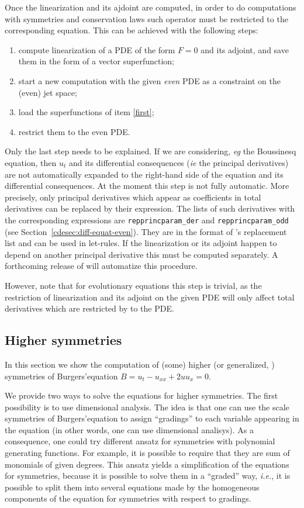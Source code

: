 Once the linearization and its ajdoint are computed, in order to do
computations with symmetries and conservation laws such operator must be
restricted to the corresponding equation. This can be achieved with the
following steps:
\begin{enumerate}
\item \label{first} compute linearization of a PDE of the form $F=0$ and its
  adjoint, and save them in the form of a vector superfunction;
\item start a new computation with the given \emph{even} PDE as a constraint on
  the (even) jet space;
\item load the superfunctions of item \ref{first};
\item restrict them to the even PDE.
\end{enumerate}
Only the last step needs to be explained. If we are considering, \emph{eg} the
Boussinesq equation, then $u_t$ and its differential consequences (\emph{ie}
the principal derivatives) are not automatically expanded to the right-hand
side of the equation and its differential consequences. At the moment this step
is not fully automatic. More precisely, only principal derivatives which appear
as coefficients in total derivatives can be replaced by their expression.  The
lists of such derivatives with the corresponding expressions are
\texttt{repprincparam\_der} and \texttt{repprincparam\_odd} (see
Section~\ref{cdesec:diff-equat-even}). They are in the format of \REDUCE's
replacement list and can be used in let-rules. If the linearization or its
adjoint happen to depend on another principal derivative this must be computed
separately. A forthcoming release of \REDUCE will automatize this procedure.

However, note that for evolutionary equations this step is trivial, as the
restriction of linearization and its adjoint on the given PDE will only affect
total derivatives which are restricted by \cde to the PDE.

\subsection{Higher symmetries}\label{cdesec:higher-symmetries}
\label{cdesec:higher-symmetries-1}

In this section we show the computation of (some) higher \cite{Krasilshchik:99} (or
generalized, \cite{Olver:93}) symmetries of Burgers'equation $B=u_t-u_{xx}+2uu_x=0$.

We provide two ways to solve the equations for higher symmetries. The first
possibility is to use dimensional analysis. The idea is that one can use the
scale symmetries of Burgers'equation to assign ``gradings'' to each variable
appearing in the equation (in other words, one can use dimensional
analisys). As a consequence, one could try different ansatz for symmetries with
polynomial generating functions. For example, it is possible to require that
they are sum of monomials of given degrees. This ansatz yields a simplification
of the equations for symmetries, because it is possible to solve them in a
``graded'' way, \emph{i.e.}, it is possible to split them into several
equations made by the homogeneous components of the equation for symmetries
with respect to gradings.

